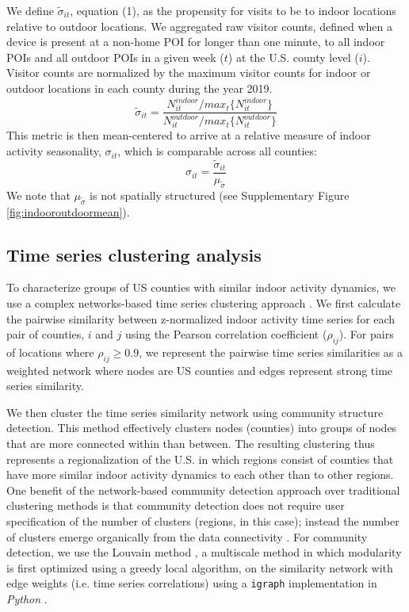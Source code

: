 \documentclass{article}
\begin{document}
We define $\widetilde{\sigma}_{it}$, equation (1), as the propensity for visits to be to indoor locations relative to outdoor locations. We aggregated raw visitor counts, defined when a device is present at a non-home POI for longer than one minute, to all indoor POIs and all outdoor POIs in a given week ($t$) at the U.S. county level ($i$). Visitor counts are normalized by the maximum visitor counts for indoor or outdoor locations in each county during the year 2019.
\begin{equation}\label{eq1}
\widetilde{\sigma}_{it} = \frac{N^{indoor}_{it} / max_t \{N^{indoor}_{it}\}}{N^{outdoor}_{it} / max_t \{N^{outdoor}_{it}\}}\end{equation}
This metric is then mean-centered to arrive at a relative measure of indoor activity seasonality, ${\sigma}_{it}$, which is comparable across all counties:
\begin{equation}\label{eq2}
{\sigma}_{it} = \frac{\widetilde{\sigma}_{it}}{\mu_{\tilde{\sigma}}}\end{equation}
We note that $\mu_{\tilde{\sigma}}$ is not spatially structured (see Supplementary Figure \ref{fig:indooroutdoormean}).

\subsection*{Time series clustering analysis}
To characterize groups of US counties with similar indoor activity dynamics, we use a complex networks-based time series clustering approach \cite{rosensteel2021characterizing}. We first calculate the pairwise similarity between z-normalized indoor activity time series for each pair of counties, $i$ and $j$ using the Pearson correlation coefficient ($\rho_{ij}$). For pairs of locations where $\rho_{ij} \geq 0.9$, we represent the pairwise time series similarities as a weighted network where nodes  are US counties and edges represent strong time series similarity.

We then cluster the time series similarity network using community structure detection. This method effectively clusters nodes (counties) into groups of nodes that are more connected within than between. The resulting clustering thus represents a regionalization of the U.S. in which regions consist of counties that have more similar indoor activity dynamics to each other than to other regions. One benefit of the network-based community detection approach over traditional clustering methods is that community detection does not require user specification of the number of clusters (regions, in this case); instead the number of clusters emerge organically from the data connectivity \cite{clustering}. For community detection, we use the Louvain method \cite{blondel2008fast}, a multiscale method in which modularity is first optimized using a greedy local algorithm, on the similarity network with edge weights (i.e. time series correlations) using a \texttt{igraph} implementation in \emph{Python} \cite{louvain_github_igraph}.
\end{document}
